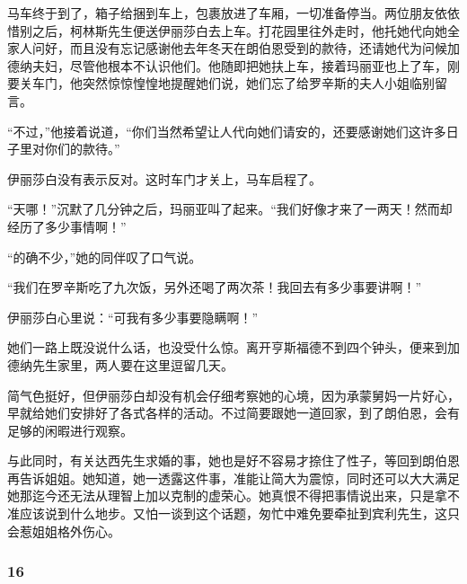 \par 马车终于到了，箱子给捆到车上，包裹放进了车厢，一切准备停当。两位朋友依依惜别之后，柯林斯先生便送伊丽莎白去上车。打花园里往外走时，他托她代向她全家人问好，而且没有忘记感谢他去年冬天在朗伯恩受到的款待，还请她代为问候加德纳夫妇，尽管他根本不认识他们。他随即把她扶上车，接着玛丽亚也上了车，刚要关车门，他突然惊惊惶惶地提醒她们说，她们忘了给罗辛斯的夫人小姐临别留言。
\par “不过，”他接着说道，“你们当然希望让人代向她们请安的，还要感谢她们这许多日子里对你们的款待。”
\par 伊丽莎白没有表示反对。这时车门才关上，马车启程了。
\par “天哪！”沉默了几分钟之后，玛丽亚叫了起来。“我们好像才来了一两天！然而却经历了多少事情啊！”
\par “的确不少，”她的同伴叹了口气说。
\par “我们在罗辛斯吃了九次饭，另外还喝了两次茶！我回去有多少事要讲啊！”
\par 伊丽莎白心里说：“可我有多少事要隐瞒啊！”
\par 她们一路上既没说什么话，也没受什么惊。离开亨斯福德不到四个钟头，便来到加德纳先生家里，两人要在这里逗留几天。
\par 简气色挺好，但伊丽莎白却没有机会仔细考察她的心境，因为承蒙舅妈一片好心，早就给她们安排好了各式各样的活动。不过简要跟她一道回家，到了朗伯恩，会有足够的闲暇进行观察。
\par 与此同时，有关达西先生求婚的事，她也是好不容易才捺住了性子，等回到朗伯恩再告诉姐姐。她知道，她一透露这件事，准能让简大为震惊，同时还可以大大满足她那迄今还无法从理智上加以克制的虚荣心。她真恨不得把事情说出来，只是拿不准应该说到什么地步。又怕一谈到这个话题，匆忙中难免要牵扯到宾利先生，这只会惹姐姐格外伤心。



\subsubsection*{16}


